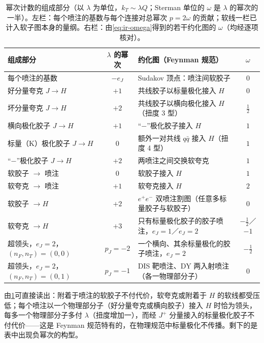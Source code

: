 \begin{table}[htbp]\centering\small
\caption{幂次计数的组成部分（以 $\lambda$ 为单位，$k_T\sim\lambda Q$；Sterman 单位的 $\omega$ 是 $\lambda$ 的幂次的一半）。左栏：每个喷注的基数与每个连接对总幂次 $p=2\omega$ 的贡献；软线一栏已计入软子图本身的量纲。右栏：由\cref{eq:ir-omega}得到的若干约化图的 $\omega$（均经逐项核对）。}
\label{tab:ir-connection-powers}
\begin{tabularx}{\textwidth}{@{}lc@{\quad}>{\raggedright\arraybackslash}Xc@{}}
\toprule
组成部分 & $\lambda$ 的幂次 & 约化图（Feynman 规范） & $\omega$ \\
\midrule
每个喷注的基数 & $-e_J$ & Sudakov 顶点：喷注间软胶子 & $0$ \\
好分量夸克 $J\to H$ & $+1$ & 共线胶子以标量极化接入 $H$ & $0$ \\
坏分量夸克 $J\to H$ & $+2$ & 共线胶子以横向极化接入 $H$（扭度 3 型） & $\tfrac12$ \\
横向极化胶子 $J\to H$ & $+1$ & “$-$”极化胶子接入 $H$ & $1$ \\
标量（K）极化胶子 $J\to H$ & $0$ & 额外一对共线 $q\bar q$ 接入 $H$（扭度 4 型） & $1$ \\
“$-$”极化胶子 $J\to H$ & $+2$ & 两喷注之间交换软夸克 & $1$ \\
软胶子 $\to$ 喷注 & $0$ & 软胶子接入 $H$ & $1$ \\
软夸克 $\to$ 喷注 & $+1$ & 软夸克接入 $H$ & $2$ \\
软胶子 $\to H$ & $+2$ & $e^+e^-$ 双喷注割图（任意多标量胶子与软胶子） & $0$ \\
软夸克 $\to H$ & $+3$ & 只有标量极化胶子的胶子喷注，$e_J=1$／$e_J=2$ & $-\tfrac12$／$-1$ \\
\midrule
超领头，$e_J=2$，$(n_F,n_T)=(0,0)$ & $p_J=-2$ & 一个横向、其余标量极化的胶子喷注，$e_J=2$ & $-\tfrac12$ \\
超领头，$e_J=2$，$(n_F,n_T)=(0,1)$ & $p_J=-1$ & DIS 靶喷注、DY 两入射喷注（各一物理部分子） & $0$ \\
\bottomrule
\end{tabularx}
\end{table}

由\cref{tab:ir-connection-powers}可直接读出：附着于喷注的软胶子不付代价，软夸克或附着于 $H$ 的软线都受压低；每个喷注以一个物理部分子（好分量夸克或横向胶子）接入 $H$ 时恰为领头，每多一个物理部分子多付 $\lambda$（扭度增加一），而经 $J^+$ 分量接入的标量极化胶子不付代价——这是 Feynman 规范特有的，在物理规范中标量极化不传播\cite[第~2.4~节]{Sterman:1995fz}。剩下的是表中出现负幂次的构型。

